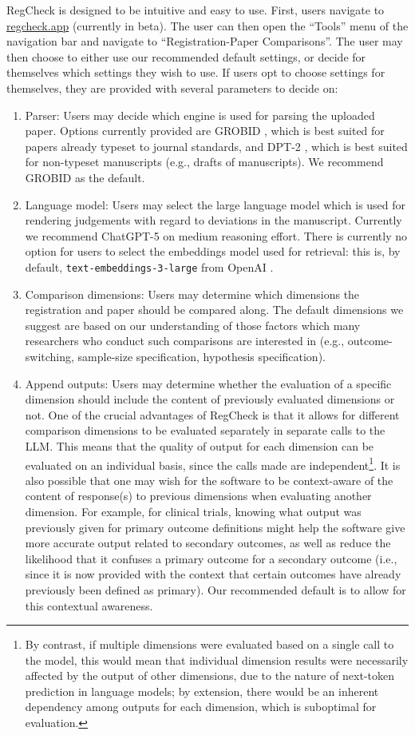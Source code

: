 \documentclass{article}
\begin{document}
RegCheck is designed to be intuitive and easy to use. First, users navigate to \href{https://regcheck.app}{regcheck.app} (currently in beta). The user can then open the ``Tools'' menu of the navigation bar and navigate to ``Registration-Paper Comparisons''. The user may then choose to either use our recommended default settings, or decide for themselves which settings they wish to use. If users opt to choose settings for themselves, they are provided with several parameters to decide on:
\begin{enumerate}
  \item Parser: Users may decide which engine is used for parsing the uploaded paper. Options currently provided are GROBID \citep{grobid_grobid_2025}, which is best suited for papers already typeset to journal standards, and DPT-2 \citep{huang_document_2025}, which is best suited for non-typeset manuscripts (e.g., drafts of manuscripts). We recommend GROBID as the default.
  \item Language model: Users may select the large language model which is used for rendering judgements with regard to deviations in the manuscript. Currently we recommend ChatGPT-5 on medium reasoning effort. There is currently no option for users to select the embeddings model used for retrieval: this is, by default, \texttt{text-embeddings-3-large} from OpenAI \citep{openai_openai_nodate}.
  \item Comparison dimensions: Users may determine which dimensions the registration and paper should be compared along. The default dimensions we suggest are based on our understanding of those factors which many researchers who conduct such comparisons are interested in (e.g., outcome-switching, sample-size specification, hypothesis specification).
  \item Append outputs: Users may determine whether the evaluation of a specific dimension should include the content of previously evaluated dimensions or not. One of the crucial advantages of RegCheck is that it allows for different comparison dimensions to be evaluated separately in separate calls to the LLM. This means that the quality of output for each dimension can be evaluated on an individual basis, since the calls made are independent\footnote{By contrast, if multiple dimensions were evaluated based on a single call to the model, this would mean that individual dimension results were necessarily affected by the output of other dimensions, due to the nature of next-token prediction in language models; by extension, there would be an inherent dependency among outputs for each dimension, which is suboptimal for evaluation.}. It is also possible that one may wish for the software to be context-aware of the content of response(s) to previous dimensions when evaluating another dimension. For example, for clinical trials, knowing what output was previously given for primary outcome definitions might help the software give more accurate output related to secondary outcomes, as well as reduce the likelihood that it confuses a primary outcome for a secondary outcome (i.e., since it is now provided with the context that certain outcomes have already previously been defined as primary). Our recommended default is to allow for this contextual awareness.
\end{enumerate}
\end{document}
